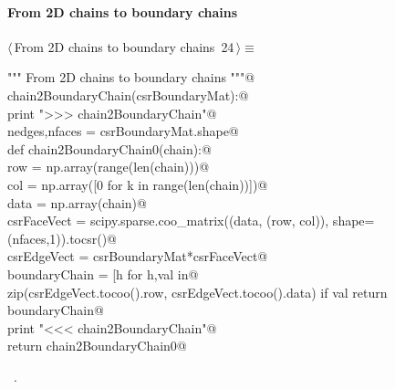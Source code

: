 \documentclass[11pt,oneside]{article}    %
\begin{document}
\paragraph{From 2D chains to boundary chains}
\begin{flushleft} \small \label{scrap38}
\protect{}$\langle\,$From 2D chains to boundary chains\nobreak\ {\footnotesize 24}$\,\rangle\equiv$
\vspace{-1ex}
\begin{list}{}{} \item
\mbox{}\verb@""" From 2D chains to boundary chains """@\\
\mbox{}\verb@def chain2BoundaryChain(csrBoundaryMat):@\\
\mbox{}\verb@    print ">>> chain2BoundaryChain"@\\
\mbox{}\verb@    nedges,nfaces = csrBoundaryMat.shape@\\
\mbox{}\verb@    def chain2BoundaryChain0(chain):@\\
\mbox{}\verb@        row = np.array(range(len(chain)))@\\
\mbox{}\verb@        col = np.array([0 for k in range(len(chain))])@\\
\mbox{}\verb@        data = np.array(chain)@\\
\mbox{}\verb@        csrFaceVect = scipy.sparse.coo_matrix((data, (row, col)), shape=(nfaces,1)).tocsr()@\\
\mbox{}\verb@        csrEdgeVect = csrBoundaryMat*csrFaceVect@\\
\mbox{}\verb@        boundaryChain = [h for h,val in@\\
\mbox{}\verb@            zip(csrEdgeVect.tocoo().row, csrEdgeVect.tocoo().data) if val%2 != 0]@\\
\mbox{}\verb@        return boundaryChain@\\
\mbox{}\verb@    print "<<< chain2BoundaryChain"@\\
\mbox{}\verb@    return chain2BoundaryChain0@\\
\mbox{}\verb@@{\NWsep}
\end{list}
\vspace{-1ex}
\footnotesize\addtolength{\baselineskip}{-1ex}
\begin{list}{}{\setlength{\itemsep}{-\parsep}\setlength{\itemindent}{-\leftmargin}}
\item \NWtxtMacroRefIn\ .
\end{list}
\end{flushleft}
\end{document}
